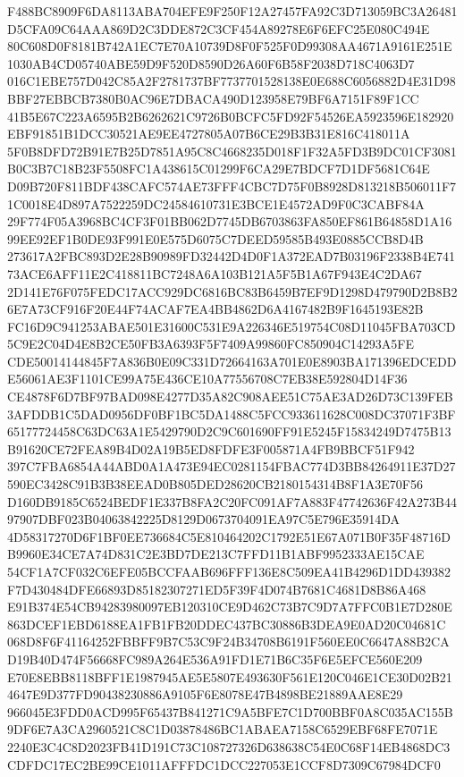 \documentclass[UTF8,fontset=fandol,zihao=-4,a4paper]{ctexart}
\begin{document}
{{F488BC8909F6DA8113ABA704EFE9F250F12A27457FA92C3D713059BC3A26481D5CFA09C64AAA869D2C3DDE872C3CF454A89278E6F6EFC25E080C494E
80C608D0F8181B742A1EC7E70A10739D8F0F525F0D99308AA4671A9161E251E1030AB4CD05740ABE59D9F520D8590D26A60F6B58F2038D718C4063D7
016C1EBE757D042C85A2F2781737BF7737701528138E0E688C6056882D4E31D98BBF27EBBCB7380B0AC96E7DBACA490D123958E79BF6A7151F89F1CC
41B5E67C223A6595B2B6262621C9726B0BCFC5FD92F54526EA5923596E182920EBF91851B1DCC30521AE9EE4727805A07B6CE29B3B31E816C418011A
5F0B8DFD72B91E7B25D7851A95C8C4668235D018F1F32A5FD3B9DC01CF3081B0C3B7C18B23F5508FC1A438615C01299F6CA29E7BDCF7D1DF5681C64E
D09B720F811BDF438CAFC574AE73FFF4CBC7D75F0B8928D813218B506011F71C0018E4D897A7522259DC24584610731E3BCE1E4572AD9F0C3CABF84A
29F774F05A3968BC4CF3F01BB062D7745DB6703863FA850EF861B64858D1A1699EE92EF1B0DE93F991E0E575D6075C7DEED59585B493E0885CCB8D4B
273617A2FBC893D2E28B90989FD32442D4D0F1A372EAD7B03196F2338B4E74173ACE6AFF11E2C418811BC7248A6A103B121A5F5B1A67F943E4C2DA67
2D141E76F075FEDC17ACC929DC6816BC83B6459B7EF9D1298D479790D2B8B26E7A73CF916F20E44F74ACAF7EA4BB4862D6A4167482B9F1645193E82B
FC16D9C941253ABAE501E31600C531E9A226346E519754C08D11045FBA703CD5C9E2C04D4E8B2CE50FB3A6393F5F7409A99860FC850904C14293A5FE
CDE50014144845F7A836B0E09C331D72664163A701E0E8903BA171396EDCEDDE56061AE3F1101CE99A75E436CE10A77556708C7EB38E592804D14F36
CE4878F6D7BF97BAD098E4277D35A82C908AEE51C75AE3AD26D73C139FEB3AFDDB1C5DAD0956DF0BF1BC5DA1488C5FCC933611628C008DC37071F3BF
65177724458C63DC63A1E5429790D2C9C601690FF91E5245F15834249D7475B13B91620CE72FEA89B4D02A19B5ED8FDFE3F005871A4FB9BBCF51F942
397C7FBA6854A44ABD0A1A473E94EC0281154FBAC774D3BB84264911E37D27590EC3428C91B3B38EEAD0B805DED28620CB2180154314B8F1A3E70F56
D160DB9185C6524BEDF1E337B8FA2C20FC091AF7A883F47742636F42A273B4497907DBF023B04063842225D8129D0673704091EA97C5E796E35914DA
4D58317270D6F1BF0EE736684C5E810464202C1792E51E67A071B0F35F48716DB9960E34CE7A74D831C2E3BD7DE213C7FFD11B1ABF9952333AE15CAE
54CF1A7CF032C6EFE05BCCFAAB696FFF136E8C509EA41B4296D1DD439382F7D430484DFE66893D85182307271ED5F39F4D074B7681C4681D8B86A468
E91B374E54CB94283980097EB120310CE9D462C73B7C9D7A7FFC0B1E7D280E863DCEF1EBD6188EA1FB1FB20DDEC437BC30886B3DEA9E0AD20C04681C
068D8F6F41164252FBBFF9B7C53C9F24B34708B6191F560EE0C6647A88B2CAD19B40D474F56668FC989A264E536A91FD1E71B6C35F6E5EFCE560E209
E70E8EBB8118BFF1E1987945AE5E5807E493630F561E120C046E1CE30D02B214647E9D377FD90438230886A9105F6E8078E47B4898BE21889AAE8E29
966045E3FDD0ACD995F65437B841271C9A5BFE7C1D700BBF0A8C035AC155B9DF6E7A3CA2960521C8C1D03878486BC1ABAEA7158C6529EBF68FE7071E
2240E3C4C8D2023FB41D191C73C108727326D638638C54E0C68F14EB4868DC3CDFDC17EC2BE99CE1011AFFFDC1DCC227053E1CCF8D7309C67984DCF0
}}
\end{document}
